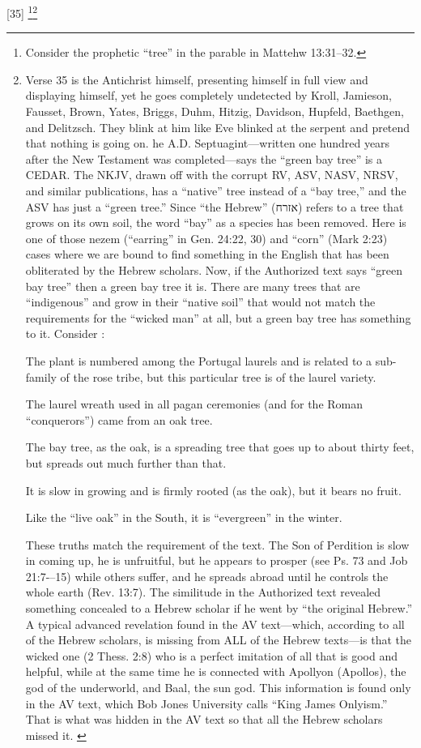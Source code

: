 [35] \footnote{Consider the prophetic ``tree'' in the parable in Mattehw 13:31--32.}\footnote{Verse 35 is the Antichrist himself, presenting himself in full view and displaying himself, yet he goes completely undetected by Kroll, Jamieson, Fausset, Brown, Yates, Briggs, Duhm, Hitzig, Davidson, Hupfeld, Baethgen, and Delitzsch. They blink at him like Eve blinked at the serpent and pretend that nothing is going on. he A.D. Septuagint—written one hundred years after the New Testament was completed—says the “green bay tree” is a CEDAR. The NKJV, drawn off with the corrupt RV, ASV, NASV, NRSV, and similar publications, has a “native” tree instead of a “bay tree,” and the ASV has just a “green tree.” Since “the Hebrew” (אזרח) refers to a tree that grows on its own soil, the word “bay” as a species has been removed. Here is one of those nezem (“earring” in Gen. 24:22, 30) and “corn” (Mark 2:23) cases where we are bound to find something in the English that has been obliterated by the Hebrew scholars. Now, if the Authorized text says “green bay tree” then a green bay tree it is. There are many trees that are “indigenous” and grow in their “native soil” that would not match the requirements for the “wicked man” at all, but a green bay tree has something to it. Consider \cite{Ruckman1992Psalms}:
\begin{compactenum}
\item The plant is numbered among the Portugal laurels and is related to a sub-family of the rose tribe, but this particular tree is of the laurel variety.
\item The laurel wreath used in all pagan ceremonies (and for the Roman “conquerors”) came from an oak tree.
\item The bay tree, as the oak, is a spreading tree that goes up to about thirty feet, but spreads out much further than that.
\item It is slow in growing and is firmly rooted (as the oak), but it bears no fruit.
\item Like the “live oak” in the South, it is “evergreen” in the winter.
\end{compactenum} These truths match the requirement of the text. The Son of Perdition is slow in coming up, he is unfruitful, but he appears to prosper (see Ps. 73 and Job 21:7-–15) while others suffer, and he spreads abroad until he controls the whole earth (Rev. 13:7). The similitude in the Authorized text revealed something concealed to a Hebrew scholar if he went by “the original Hebrew.”  A typical advanced revelation found in the AV text—which, according to all of the Hebrew scholars, is missing from ALL of the Hebrew texts—is that the wicked one (2 Thess. 2:8) who is a perfect imitation of all that is good and helpful, while at the same time he is connected with Apollyon (Apollos), the god of the underworld, and Baal, the sun god. This information is found only in the AV text, which Bob Jones University calls “King James Onlyism.” That is what was hidden in the AV text so that all the Hebrew scholars missed it. \cite{Ruckman1992Psalms}}
